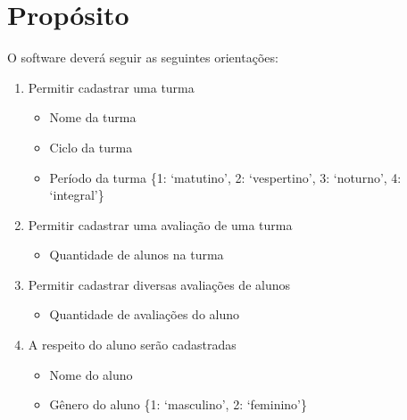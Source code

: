 \documentclass[a4paper,12pt]{report}
\begin{document}
        \section{Propósito}
        O software deverá seguir as seguintes orientações:

        \begin{enumerate}

            \item Permitir cadastrar uma turma

                \begin{itemize}

                    \item Nome da turma

                    \item Ciclo da turma

                    \item Período da turma \{1: `matutino', 2: `vespertino',
                        3: `noturno', 4: `integral'\}

                \end{itemize}

            \item Permitir cadastrar uma avaliação de uma turma

                \begin{itemize}

                    \item Quantidade de alunos na turma

                \end{itemize}

            \item Permitir cadastrar diversas avaliações de alunos

                \begin{itemize}

                    \item Quantidade de avaliações do aluno

                \end{itemize}

            \item A respeito do aluno serão cadastradas

                \begin{itemize}

                    \item Nome do aluno

                    \item Gênero do aluno \{1: `masculino', 2: `feminino'\}


\end{itemize}
\end{enumerate}
\end{document}
